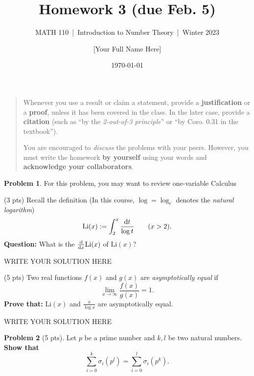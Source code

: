 \documentclass[11pt]{article}
\title{Homework 3 (due Feb. 5)}
\author{[Your Full Name Here]}
\subtitle{MATH 110~|~Introduction to Number Theory~|~Winter 2023}
\date{\today}
\theoremstyle{plain}
\theoremstyle{definition}
\newtheorem{problem}{Problem}
\theoremstyle{remark}
\numberwithin{equation}{problem}
\begin{document}
\maketitle

\begin{quotation}
	Whenever you use a result or claim a statement, provide a \textbf{justification} or a \textbf{proof}, unless it has been covered in the class. In the later case, provide a \textbf{citation} (such as ``by the \emph{2-out-of-3 principle}'' or ``by Coro. 0.31 in the textbook'').

	You are encouraged to \emph{discuss} the problems with your peers. However, you must write the homework \textbf{by yourself} using your words and \textbf{acknowledge your collaborators}.
\end{quotation}

\begin{problem}
	For this problem, you may want to review one-variable Calculus
	\begin{listinprob}
		\item (3 pts) Recall the definition (In this course, $\log=\log_{e}$ denotes the \emph{natural logarithm})
									\[
										\mathrm{Li}(x):=
											\int_{2}^{x}\frac{\odif{t}}{\log{t}}
										\qquad (x>2).
									\]
									\textbf{Question:} What is the  $\odv*{}{x}\mathrm{Li}(x)$ of $\mathrm{Li}(x)$?
		
\begin{solution} %
WRITE YOUR SOLUTION HERE
\end{solution}\clearpage %

		\item (5 pts) Two real functions $f(x)$ and $g(x)$ are \emph{asymptotically equal} if 
		\[
			\lim_{x\to\infty} \frac{f(x)}{g(x)} = 1.
		\]
		\textbf{Prove that:} $\mathrm{Li}(x)$ and $\frac{x}{\log{x}}$ are asymptotically equal.
	\end{listinprob}
\end{problem}
		
\begin{solution} %
WRITE YOUR SOLUTION HERE
\end{solution}\clearpage %


\begin{problem}[5 pts]
	Let $p$ be a prime number and $k,l$ be two natural numbers. 
	\textbf{Show that} 
	\[
		\sum_{i=0}^{k}\sigma_{i}(p^l) = \sum_{i=0}^{l}\sigma_{i}(p^k).
	\]
\end{problem}
		
\end{document}
